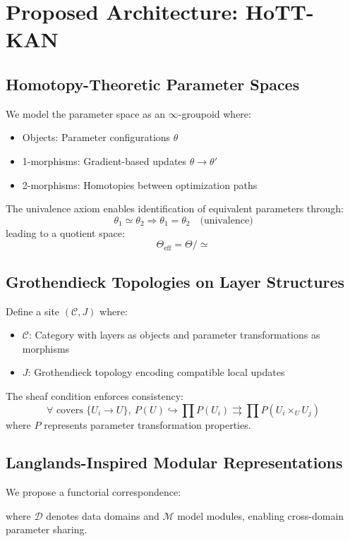 \documentclass{article}
\begin{document}
\section{Proposed Architecture: HoTT-KAN}
\label{sec:hott_kan_arch}

\subsection{Homotopy-Theoretic Parameter Spaces}
We model the parameter space as an $\infty$-groupoid where:
\begin{itemize}
    \item Objects: Parameter configurations $\theta$
    \item 1-morphisms: Gradient-based updates $\theta \to \theta'$
    \item 2-morphisms: Homotopies between optimization paths
\end{itemize}

The univalence axiom enables identification of equivalent parameters through:
\begin{equation}
    \theta_1 \simeq \theta_2 \Rightarrow \theta_1 = \theta_2 \quad \text{(univalence)}
\end{equation}
leading to a quotient space:
\begin{equation}
    \Theta_{\text{eff}} = \Theta / {\simeq}
\end{equation}

\subsection{Grothendieck Topologies on Layer Structures}
Define a site $(\mathcal{C}, J)$ where:
\begin{itemize}
    \item $\mathcal{C}$: Category with layers as objects and parameter transformations as morphisms
    \item $J$: Grothendieck topology encoding compatible local updates
\end{itemize}

The sheaf condition enforces consistency:
\begin{equation}
    \forall \text{ covers } \{U_i \to U\},\ P(U) \hookrightarrow \prod P(U_i) \rightrightarrows \prod P(U_i \times_U U_j)
\end{equation}
where $P$ represents parameter transformation properties.

\subsection{Langlands-Inspired Modular Representations}
We propose a functorial correspondence:
\begin{center}
\end{center}
where $\mathcal{D}$ denotes data domains and $\mathcal{M}$ model modules, enabling cross-domain parameter sharing.
\end{document}
